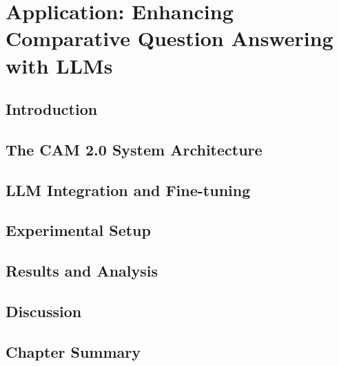 \chapter{Application: Enhancing Comparative Question Answering with LLMs}
\label{ch:comparative_qa}

\section{Introduction}
\label{sec:compqa:intro}

\section{The CAM 2.0 System Architecture}
\label{sec:compqa:cam2_arch}

\section{LLM Integration and Fine-tuning}
\label{sec:compqa:llm_integration}

\section{Experimental Setup}
\label{sec:compqa:setup}

\section{Results and Analysis}
\label{sec:compqa:results}

\section{Discussion}
\label{sec:compqa:discussion}

\section{Chapter Summary}
\label{sec:compqa:summary}
